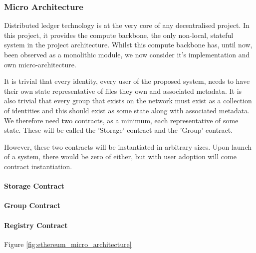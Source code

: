 \subsubsection{Micro Architecture}

Distributed ledger technology is at the very core of any decentralised project. In this project, it provides the compute backbone, the only non-local, stateful system in the project architecture. Whilst this compute backbone has, until now, been observed as a monolithic module, we now consider it's implementation and own micro-architecture.

It is trivial that every identity, every user of the proposed system, needs to have their own state representative of files they own and associated metadata. It is also trivial that every group that exists on the network must exist as a collection of identities and this should exist as some state along with associated metadata. We therefore need two contracts, as a minimum, each representative of some state. These will be called the 'Storage' contract and the 'Group' contract.

However, these two contracts will be instantiated in arbitrary sizes. Upon launch of a system, there would be zero of either, but with user adoption will come contract instantiation. 

\paragraph{Storage Contract}

\paragraph{Group Contract}

\paragraph{Registry Contract}




Figure \ref{fig:ethereum_micro_architecture}
